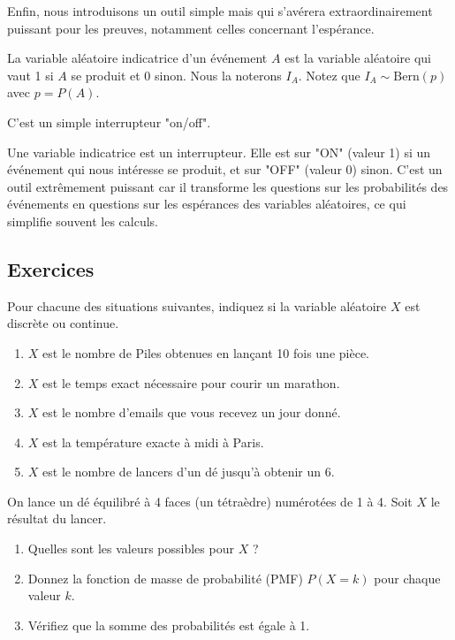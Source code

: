 Enfin, nous introduisons un outil simple mais qui s'avérera extraordinairement puissant pour les preuves, notamment celles concernant l'espérance.

\begin{definitionbox}
La variable aléatoire indicatrice d'un événement $A$ est la variable aléatoire qui vaut 1 si $A$ se produit et 0 sinon. Nous la noterons $I_A$. Notez que $I_A \sim \text{Bern}(p)$ avec $p=P(A)$.
\end{definitionbox}

C'est un simple interrupteur "on/off".

\begin{intuitionbox}
Une variable indicatrice est un interrupteur. Elle est sur "ON" (valeur 1) si un événement qui nous intéresse se produit, et sur "OFF" (valeur 0) sinon. C'est un outil extrêmement puissant car il transforme les questions sur les probabilités des événements en questions sur les espérances des variables aléatoires, ce qui simplifie souvent les calculs.
\end{intuitionbox}

\subsection{Exercices}


\begin{exercicebox}
Pour chacune des situations suivantes, indiquez si la variable aléatoire $X$ est discrète ou continue.
\begin{enumerate}
    \item $X$ est le nombre de Piles obtenues en lançant 10 fois une pièce.
    \item $X$ est le temps exact nécessaire pour courir un marathon.
    \item $X$ est le nombre d'emails que vous recevez un jour donné.
    \item $X$ est la température exacte à midi à Paris.
    \item $X$ est le nombre de lancers d'un dé jusqu'à obtenir un 6.
\end{enumerate}
\end{exercicebox}

\begin{exercicebox}
On lance un dé équilibré à 4 faces (un tétraèdre) numérotées de 1 à 4. Soit $X$ le résultat du lancer.
\begin{enumerate}
    \item Quelles sont les valeurs possibles pour $X$ ?
    \item Donnez la fonction de masse de probabilité (PMF) $P(X=k)$ pour chaque valeur $k$.
    \item Vérifiez que la somme des probabilités est égale à 1.
\end{enumerate}
\end{exercicebox}

